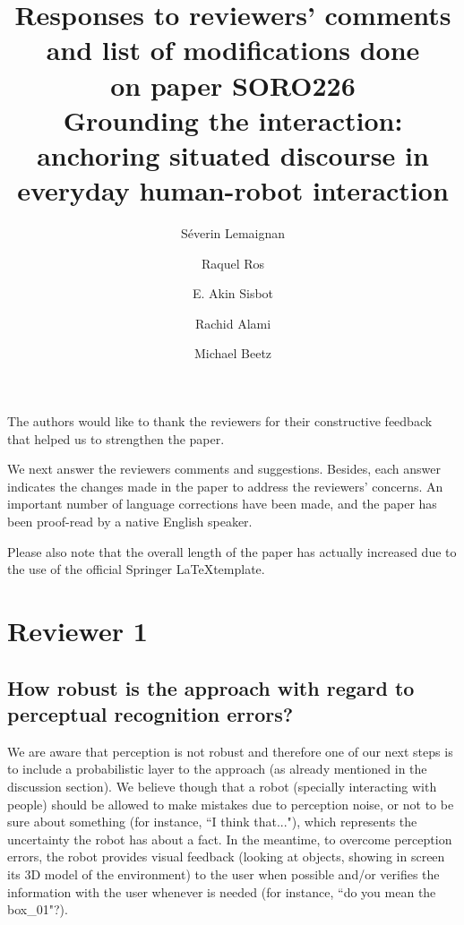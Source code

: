 \documentclass[11pt]{article}
\title{Responses to reviewers' comments and list of modifications done\\ on paper SORO226\\
\LARGE{\textbf{Grounding the interaction: anchoring situated discourse in everyday human-robot interaction}}}
\author{S\'everin Lemaignan \and Raquel Ros \and E. Akin Sisbot \and Rachid Alami \and Michael Beetz}
\begin{document}
\maketitle

The authors would like to thank the reviewers for their constructive feedback
that helped us to strengthen the paper.

We next answer the reviewers comments and suggestions. Besides, each answer
indicates the changes made in the paper to address the reviewers' concerns. An
important number of language corrections have been made, and the paper has been
proof-read by a native English speaker.

Please also note that the overall length of the paper has actually 
increased due to the use of the official Springer \LaTeX template.




\section{Reviewer 1}

\subsection{How robust is the approach with regard to perceptual recognition
errors?}

We are aware that perception is not robust and therefore one of our next steps
is to include a probabilistic layer to the approach (as already mentioned in
the discussion section). We believe though that a robot (specially interacting
with people) should be allowed to make mistakes due to perception noise, or not
to be sure about something (for instance, ``I think that..."), which represents
the uncertainty the robot has about a fact. In the meantime, to overcome
perception errors, the robot provides visual feedback (looking at objects,
showing in screen its 3D model of the environment) to the user when possible
and/or verifies the information with the user whenever is needed (for instance,
``do you mean the box\_01"?). 
\end{document}
